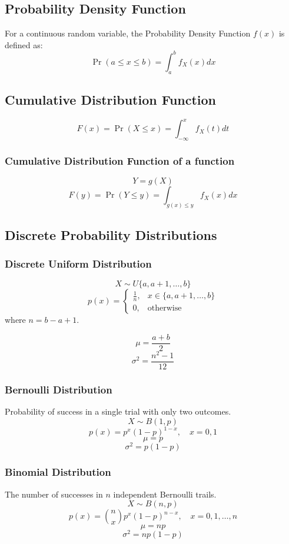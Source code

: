 \documentclass{article}
\begin{document}
\subsection{Probability Density Function}
For a continuous random variable, the Probability Density Function \( f(x) \) is defined as:
\[
    \Pr(a \le x \le b) = \int_{a}^{b} f_X(x)dx
\]

\subsection{Cumulative Distribution Function}
\[
    F(x) = \Pr(X \le x) = \int_{-\infty}^{x} f_X(t)dt
\]

\subsubsection{Cumulative Distribution Function of a function}
\[
    Y=g(X)
\]
\[
    F(y) = \Pr(Y \le y) = \int_{g(x) \le y} f_X(x)dx
\]

\subsection{Discrete Probability Distributions}

\subsubsection{Discrete Uniform Distribution}
\[
    X \sim U\{a, a+1, \dots, b\}
\]
\[
    p(x) =
    \begin{cases}
        \frac{1}{n}, & x \in \{a, a+1, \dots, b\} \\
        0, & \text{otherwise}
    \end{cases}
\]
where $n = b - a + 1$.

\[
    \mu = \frac{a + b}{2}
\]
\[
    \sigma^2 = \frac{n^2 - 1}{12}
\]

\subsubsection{Bernoulli Distribution}
Probability of success in a single trial with only two outcomes.
\[ X \sim B(1,p) \]
\[ p(x) = p^x (1-p)^{1-x}, \quad x=0,1 \]
\[ \mu = p \]
\[ \sigma^2 = p(1-p) \]

\subsubsection{Binomial Distribution}
The number of successes in \( n \) independent Bernoulli trails.
\[ X \sim B(n,p) \]
\[ p(x) = \binom{n}{x} p^x (1-p)^{n-x}, \quad x=0,1,\dots,n \]
\[ \mu = np \]
\[ \sigma^2 = np(1-p) \]
\end{document}
